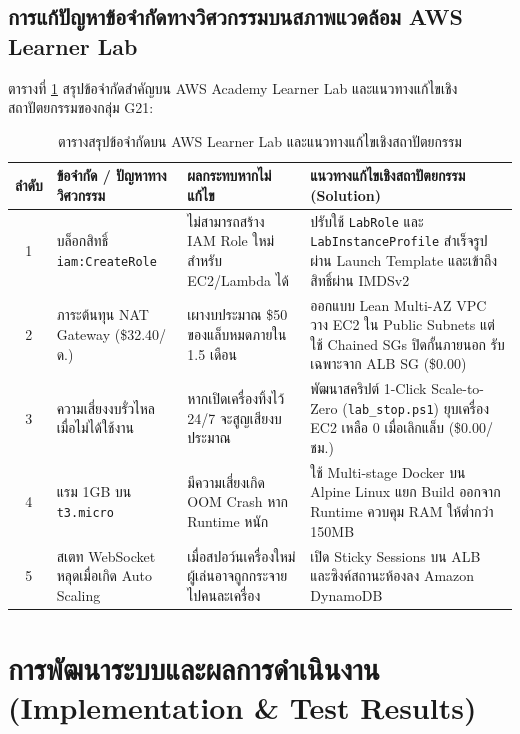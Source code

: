\documentclass[12pt,a4paper]{report}
\begin{document}
\section{การแก้ปัญหาข้อจำกัดทางวิศวกรรมบนสภาพแวดล้อม AWS Learner Lab}
ตารางที่ \ref{tab:learner_lab_solutions} สรุปข้อจำกัดสำคัญบน AWS Academy Learner Lab และแนวทางแก้ไขเชิงสถาปัตยกรรมของกลุ่ม G21:

\begin{table}[H]
\centering
\caption{ตารางสรุปข้อจำกัดบน AWS Learner Lab และแนวทางแก้ไขเชิงสถาปัตยกรรม}
\label{tab:learner_lab_solutions}
\small
\begin{tabularx}{\textwidth}{cl>{\raggedright\arraybackslash}p{4.2cm}>{\raggedright\arraybackslash}X}
\toprule
\textbf{ลำดับ} & \textbf{ข้อจำกัด / ปัญหาทางวิศวกรรม} & \textbf{ผลกระทบหากไม่แก้ไข} & \textbf{แนวทางแก้ไขเชิงสถาปัตยกรรม (Solution)} \\
\midrule
1 & บล็อกสิทธิ์ \texttt{iam:CreateRole} & ไม่สามารถสร้าง IAM Role ใหม่สำหรับ EC2/Lambda ได้ & ปรับใช้ \texttt{LabRole} และ \texttt{LabInstanceProfile} สำเร็จรูปผ่าน Launch Template และเข้าถึงสิทธิ์ผ่าน IMDSv2 \\
2 & ภาระต้นทุน NAT Gateway (\$32.40/ด.) & เผางบประมาณ \$50 ของแล็บหมดภายใน 1.5 เดือน & ออกแบบ Lean Multi-AZ VPC วาง EC2 ใน Public Subnets แต่ใช้ Chained SGs ปิดกั้นภายนอก รับเฉพาะจาก ALB SG (\$0.00) \\
3 & ความเสี่ยงงบรั่วไหลเมื่อไม่ได้ใช้งาน & หากเปิดเครื่องทิ้งไว้ 24/7 จะสูญเสียงบประมาณ & พัฒนาสคริปต์ 1-Click Scale-to-Zero (\texttt{lab\_stop.ps1}) ยุบเครื่อง EC2 เหลือ 0 เมื่อเลิกแล็บ (\$0.00/ชม.) \\
4 & แรม 1GB บน \texttt{t3.micro} & มีความเสี่ยงเกิด OOM Crash หาก Runtime หนัก & ใช้ Multi-stage Docker บน Alpine Linux แยก Build ออกจาก Runtime ควบคุม RAM ให้ต่ำกว่า 150MB \\
5 & สเตท WebSocket หลุดเมื่อเกิด Auto Scaling & เมื่อสปอว์นเครื่องใหม่ ผู้เล่นอาจถูกกระจายไปคนละเครื่อง & เปิด Sticky Sessions บน ALB และซิงค์สถานะห้องลง Amazon DynamoDB \\
\bottomrule
\end{tabularx}
\end{table}

\chapter{การพัฒนาระบบและผลการดำเนินงาน (Implementation \& Test Results)}
\end{document}
